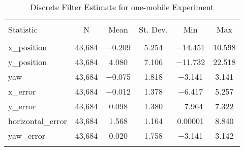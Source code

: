 
\begin{table}[h] \centering 
  \caption{Discrete Filter Estimate for one-mobile Experiment} 
  \label{tab:one_mobile_discrete_summary} 
\begin{tabular}{@{\extracolsep{5pt}}lccccc} 
\\[-1.8ex]\hline 
\hline \\[-1.8ex] 
Statistic & \multicolumn{1}{c}{N} & \multicolumn{1}{c}{Mean} & \multicolumn{1}{c}{St. Dev.} & \multicolumn{1}{c}{Min} & \multicolumn{1}{c}{Max} \\ 
\hline \\[-1.8ex] 
x\_position & 43,684 & $-$0.209 & 5.254 & $-$14.451 & 10.598 \\ 
y\_position & 43,684 & 4.080 & 7.106 & $-$11.732 & 22.518 \\ 
yaw & 43,684 & $-$0.075 & 1.818 & $-$3.141 & 3.141 \\ 
x\_error & 43,684 & $-$0.012 & 1.378 & $-$6.417 & 5.257 \\ 
y\_error & 43,684 & 0.098 & 1.380 & $-$7.964 & 7.322 \\ 
horizontal\_error & 43,684 & 1.568 & 1.164 & 0.00001 & 8.840 \\ 
yaw\_error & 43,684 & 0.020 & 1.758 & $-$3.141 & 3.142 \\ 
\hline \\[-1.8ex] 
\end{tabular} 
\end{table} 
